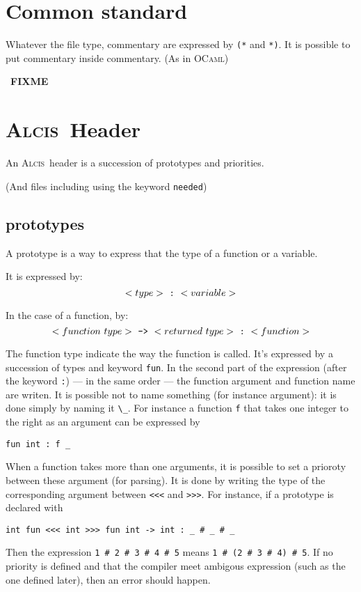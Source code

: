 \documentclass{article}
\newcommand{\Alcis}{\textsc{Alcis}~}
\newcommand{\FIXME}{~\textbf{FIXME}~}
\begin{document}
\section{Common standard}

Whatever the file type, commentary are expressed by \lstinline$(*$ and \lstinline$*)$.
It is possible to put commentary inside commentary. (As in \textsc{OCaml})

\FIXME

\section{\Alcis Header}

An \Alcis header is a succession of prototypes and priorities.

(And files including using the keyword \texttt{needed})

\subsection{prototypes}

A prototype is a way to express that the type of a function or a variable.

It is expressed by:
\[
    <type>~\textrm{\tt:}~<variable>
\]

In the case of a function, by:
\[
    <function~type>~\textrm{\tt->}~<returned~type>~\textrm{\tt:}~<function>
\]

The function type indicate the way the function is called.
It’s expressed by a succession of types and keyword \lstinline$fun$.
In the second part of the expression (after the keyword \lstinline$:$) — in the same order — the function argument and function name are writen.
It is possible not to name something (for instance argument): it is done simply by naming it \lstinline$\_$.
For instance a function \lstinline$f$ that takes one integer to the right as an argument can be expressed by
\begin{lstlisting}
fun int : f _
\end{lstlisting}

When a function takes more than one arguments, it is possible to set a prioroty between these argument (for parsing).
It is done by writing the type of the corresponding argument between \lstinline$<<<$ and \lstinline$>>>$.
For instance, if a prototype is declared with
\begin{lstlisting}
int fun <<< int >>> fun int -> int : _ # _ # _
\end{lstlisting}
Then the expression \lstinline$1 # 2 # 3 # 4 # 5$ means \lstinline$1 # (2 # 3 # 4) # 5$.
If no priority is defined and that the compiler meet ambigous expression (such as the one defined later), then an error should happen.
\end{document}
